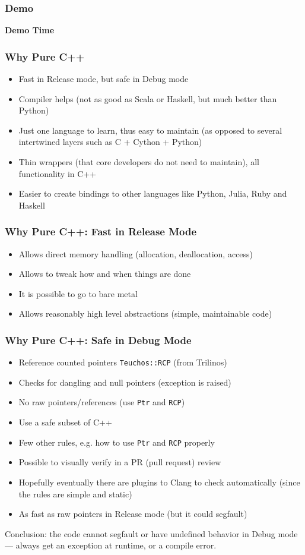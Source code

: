\documentclass{beamer}
\begin{document}
\begin{frame}
\frametitle{Demo}
{\Large\bf Demo Time}
\end{frame}


\begin{frame}
\frametitle{Why Pure C++}
\begin{itemize}
\item Fast in Release mode, but safe in Debug mode
\item Compiler helps (not as good as Scala or Haskell, but much better than
    Python)
\item Just one language to learn, thus easy to maintain (as opposed to several
    intertwined layers such as C + Cython + Python)
\item Thin wrappers (that core developers do not need to maintain), all functionality in C++
\item Easier to create bindings to other languages like Python, Julia, Ruby and Haskell
\end{itemize}
\end{frame}

\begin{frame}
\frametitle{Why Pure C++: Fast in Release Mode}
\begin{itemize}
    \item Allows direct memory handling (allocation, deallocation, access)
    \item Allows to tweak how and when things are done
    \item It is possible to go to bare metal
    \item Allows reasonably high level abstractions (simple, maintainable
        code)
\end{itemize}
\end{frame}

\begin{frame}
\frametitle{Why Pure C++: Safe in Debug Mode}
\begin{itemize}
    \item Reference counted pointers \texttt{Teuchos::RCP} (from Trilinos)
    \item Checks for dangling and null pointers (exception is raised)
    \item No raw pointers/references (use \texttt{Ptr} and \texttt{RCP})
    \item Use a safe subset of C++
    \item Few other rules, e.g. how to use \texttt{Ptr} and \texttt{RCP}
          properly
    \item Possible to visually verify in a PR (pull request) review
    \item Hopefully eventually there are plugins to Clang to check
        automatically (since the rules are simple and static)
    \item As fast as raw pointers in Release mode (but it could segfault)
\end{itemize}
    Conclusion: the code cannot segfault or have undefined behavior in Debug
    mode --- always get an exception at runtime, or a compile error.
\end{frame}
\end{document}
